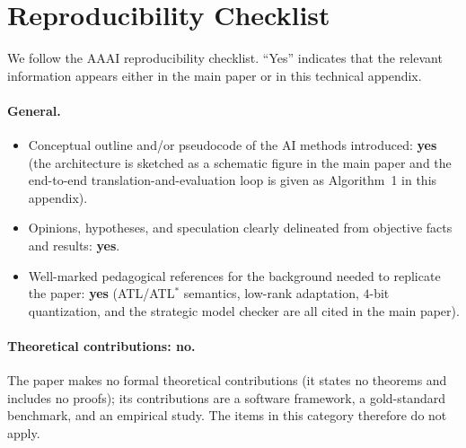 \documentclass[letterpaper]{article}
\begin{document}
\section{Reproducibility Checklist}

We follow the AAAI reproducibility checklist. ``Yes'' indicates that the relevant information appears either in the main paper or in this technical appendix.

\paragraph{General.}
\begin{itemize}[leftmargin=1.2em,itemsep=2pt]
  \item Conceptual outline and/or pseudocode of the AI methods introduced: \textbf{yes} (the architecture is sketched as a schematic figure in the main paper and the end-to-end translation-and-evaluation loop is given as Algorithm~1 in this appendix).
  \item Opinions, hypotheses, and speculation clearly delineated from objective facts and results: \textbf{yes}.
  \item Well-marked pedagogical references for the background needed to replicate the paper: \textbf{yes} (ATL/ATL$^\ast$ semantics, low-rank adaptation, $4$-bit quantization, and the strategic model checker are all cited in the main paper).
\end{itemize}

\paragraph{Theoretical contributions: no.} The paper makes no formal theoretical contributions (it states no theorems and includes no proofs); its contributions are a software framework, a gold-standard benchmark, and an empirical study. The items in this category therefore do not apply.
\end{document}
